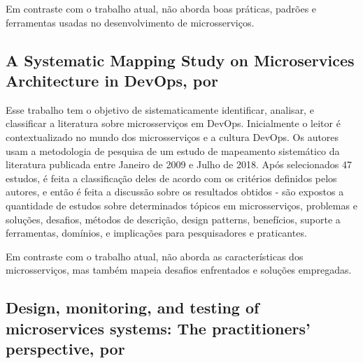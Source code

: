 Em contraste com o trabalho atual,  não aborda boas práticas, padrões e ferramentas usadas no desenvolvimento de microsserviços.

\subsection{{A Systematic Mapping Study on Microservices Architecture in DevOps, por }}

Esse trabalho tem o objetivo de sistematicamente identificar, analisar, e classificar a literatura sobre microsserviços em DevOps. Inicialmente o leitor é contextualizado no mundo dos microsserviços e a cultura DevOps. Os autores usam a metodologia de pesquisa de um estudo de mapeamento sistemático da literatura publicada entre Janeiro de 2009 e Julho de 2018. Após selecionados 47 estudos, é feita a classificação deles de acordo com os critérios definidos pelos autores, e então é feita a discussão sobre os resultados obtidos - são expostos a quantidade de estudos sobre determinados tópicos em microsserviços, problemas e soluções, desafios, métodos de descrição, design patterns, benefícios, suporte a ferramentas, domínios, e implicações para pesquisadores e praticantes.

Em contraste com o trabalho atual,  não aborda as características dos microsserviços, mas também mapeia desafios enfrentados e soluções
empregadas.


\subsection{Design, monitoring, and testing of microservices systems: The practitioners’ perspective, por }

